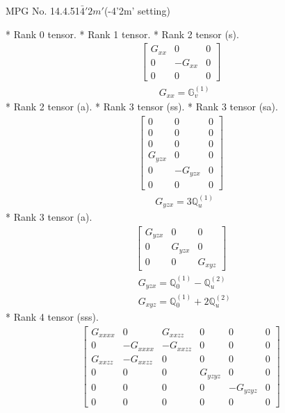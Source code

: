 \documentclass[fleqn,8pt,landscape]{jsarticle}
\begin{document}
\setcounter{MaxMatrixCols}{32}

\renewcommand{\tablename}{Table~}
\renewcommand{\figurename}{Figure~}
\begin{center}
\LARGE
MPG No. 14.4.51\quad$\bar{4}'2m'$\quad(-4'2m' setting)
\end{center}
* Rank 0 tensor.
* Rank 1 tensor.
* Rank 2 tensor (s).
\begin{align*}
\begin{bmatrix} G_{xx} & 0 & 0 \\ 0 & - G_{xx} & 0 \\ 0 & 0 & 0 \end{bmatrix}
\end{align*}
\begin{align*}
& G_{xx} = \mathbb{G}_{v}^{(1)}
\end{align*}
* Rank 2 tensor (a).
* Rank 3 tensor (ss).
* Rank 3 tensor (sa).
\begin{align*}
\begin{bmatrix} 0 & 0 & 0 \\ 0 & 0 & 0 \\ 0 & 0 & 0 \\ G_{yzx} & 0 & 0 \\ 0 & - G_{yzx} & 0 \\ 0 & 0 & 0 \end{bmatrix}
\end{align*}
\begin{align*}
& G_{yzx} = 3 \mathbb{Q}_{u}^{(1)}
\end{align*}
* Rank 3 tensor (a).
\begin{align*}
\begin{bmatrix} G_{yzx} & 0 & 0 \\ 0 & G_{yzx} & 0 \\ 0 & 0 & G_{xyz} \end{bmatrix}
\end{align*}
\begin{align*}
& G_{yzx} = \mathbb{Q}_{0}^{(1)} - \mathbb{Q}_{u}^{(2)} \\
& G_{xyz} = \mathbb{Q}_{0}^{(1)} + 2 \mathbb{Q}_{u}^{(2)}
\end{align*}
* Rank 4 tensor (sss).
\begin{align*}
\begin{bmatrix} G_{xxxx} & 0 & G_{xxzz} & 0 & 0 & 0 \\ 0 & - G_{xxxx} & - G_{xxzz} & 0 & 0 & 0 \\ G_{xxzz} & - G_{xxzz} & 0 & 0 & 0 & 0 \\ 0 & 0 & 0 & G_{yzyz} & 0 & 0 \\ 0 & 0 & 0 & 0 & - G_{yzyz} & 0 \\ 0 & 0 & 0 & 0 & 0 & 0 \end{bmatrix}
\end{align*}
\end{document}
